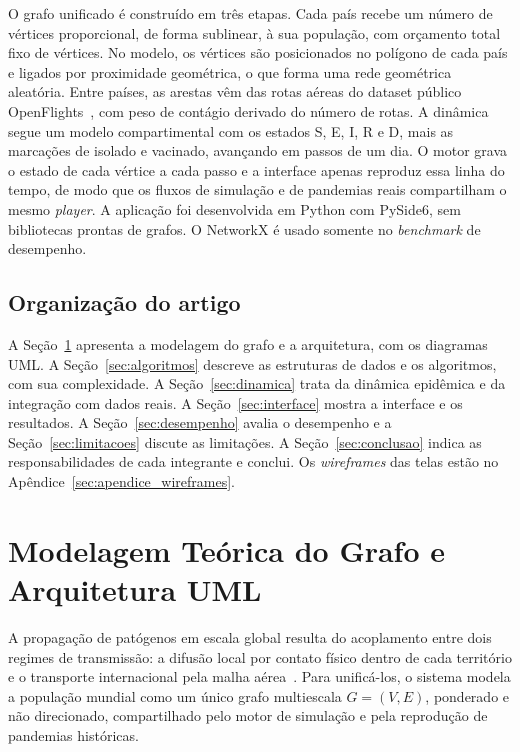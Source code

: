 \documentclass[11pt]{article}
\begin{document}
O grafo unificado é construído em três etapas. Cada país recebe um número de vértices proporcional, de forma sublinear, à sua população, com orçamento total fixo de vértices. No modelo, os vértices são posicionados no polígono de cada país e ligados por proximidade geométrica, o que forma uma rede geométrica aleatória. Entre países, as arestas vêm das rotas aéreas do dataset público OpenFlights~\cite{openflights}, com peso de contágio derivado do número de rotas. A dinâmica segue um modelo compartimental com os estados S, E, I, R e D, mais as marcações de isolado e vacinado, avançando em passos de um dia. O motor grava o estado de cada vértice a cada passo e a interface apenas reproduz essa linha do tempo, de modo que os fluxos de simulação e de pandemias reais compartilham o mesmo \emph{player}. A aplicação foi desenvolvida em Python com PySide6, sem bibliotecas prontas de grafos. O NetworkX é usado somente no \emph{benchmark} de desempenho.

\subsection{Organização do artigo}

A Seção~\ref{sec:modelagem} apresenta a modelagem do grafo e a arquitetura, com os diagramas UML. A Seção~\ref{sec:algoritmos} descreve as estruturas de dados e os algoritmos, com sua complexidade. A Seção~\ref{sec:dinamica} trata da dinâmica epidêmica e da integração com dados reais. A Seção~\ref{sec:interface} mostra a interface e os resultados. A Seção~\ref{sec:desempenho} avalia o desempenho e a Seção~\ref{sec:limitacoes} discute as limitações. A Seção~\ref{sec:conclusao} indica as responsabilidades de cada integrante e conclui. Os \emph{wireframes} das telas estão no Apêndice~\ref{sec:apendice_wireframes}.

\section{Modelagem Teórica do Grafo e Arquitetura UML} \label{sec:modelagem}

A propagação de patógenos em escala global resulta do acoplamento entre dois regimes de transmissão: a difusão local por contato físico dentro de cada território e o transporte internacional pela malha aérea~\cite{balcan2009,colizza2006}. Para unificá-los, o sistema modela a população mundial como um único grafo multiescala $G = (V, E)$, ponderado e não direcionado, compartilhado pelo motor de simulação e pela reprodução de pandemias históricas.
\end{document}
